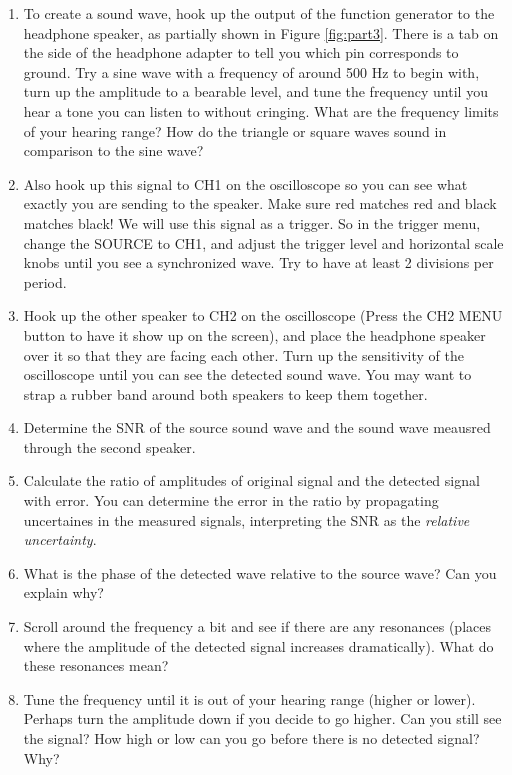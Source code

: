 \begin{enumerate}
\item To create a sound wave, hook up the output of the function generator to the headphone speaker, as partially shown in Figure \ref{fig:part3}. There is a tab on the side of the headphone adapter to tell you which pin corresponds to ground. Try a sine wave with a frequency of around 500 Hz to begin with, turn up the amplitude to a bearable level, and tune the frequency until you hear a tone you can listen to without cringing. What are the frequency limits of your hearing range? How do the triangle or square waves sound in comparison to the sine wave?

\item Also hook up this signal to CH1 on the oscilloscope so you can see what exactly you are sending to the speaker. Make sure red matches red and black matches black! We will use this signal as a trigger. So in the trigger menu, change the SOURCE to CH1, and adjust the trigger level and horizontal scale knobs until you see a synchronized wave. Try to have at least 2 divisions per period.

\item Hook up the other speaker to CH2 on the oscilloscope (Press the CH2 MENU button to have it show up on the screen), and place the headphone speaker over it so that they are facing each other. Turn up the sensitivity of the oscilloscope until you can see the detected sound wave.  You may want to strap a rubber band around both speakers to keep them together.

\item Determine the SNR of the source sound wave and the sound wave meausred through the second speaker.

\item Calculate the ratio of amplitudes of original signal and the detected signal with error. You can determine the error in the ratio by propagating uncertaines in the measured signals, interpreting the SNR as the {\it{relative uncertainty}}.

\item What is the phase of the detected wave relative to the source wave? Can you explain why?

\item Scroll around the frequency a bit and see if there are any resonances (places where the amplitude of the detected signal increases dramatically). What do these resonances mean?

\item Tune the frequency until it is out of your hearing range (higher or lower). Perhaps turn the amplitude down if you decide to go higher. Can you still see the signal? How high or low can you go before there is no detected signal? Why?

\end{enumerate}




